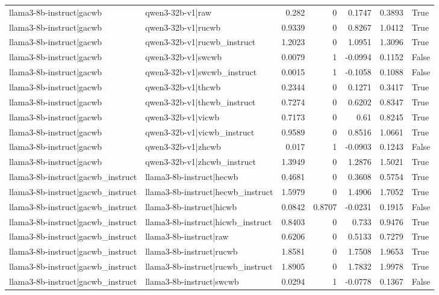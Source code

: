 \begin{table}
\begin{tabular}{l l r r r r l}
llama3-8b-instruct|gacwb & qwen3-32b-v1|raw & 0.282 & 0 & 0.1747 & 0.3893 & True \\
llama3-8b-instruct|gacwb & qwen3-32b-v1|rucwb & 0.9339 & 0 & 0.8267 & 1.0412 & True \\
llama3-8b-instruct|gacwb & qwen3-32b-v1|rucwb_instruct & 1.2023 & 0 & 1.0951 & 1.3096 & True \\
llama3-8b-instruct|gacwb & qwen3-32b-v1|swcwb & 0.0079 & 1 & -0.0994 & 0.1152 & False \\
llama3-8b-instruct|gacwb & qwen3-32b-v1|swcwb_instruct & 0.0015 & 1 & -0.1058 & 0.1088 & False \\
llama3-8b-instruct|gacwb & qwen3-32b-v1|thcwb & 0.2344 & 0 & 0.1271 & 0.3417 & True \\
llama3-8b-instruct|gacwb & qwen3-32b-v1|thcwb_instruct & 0.7274 & 0 & 0.6202 & 0.8347 & True \\
llama3-8b-instruct|gacwb & qwen3-32b-v1|vicwb & 0.7173 & 0 & 0.61 & 0.8245 & True \\
llama3-8b-instruct|gacwb & qwen3-32b-v1|vicwb_instruct & 0.9589 & 0 & 0.8516 & 1.0661 & True \\
llama3-8b-instruct|gacwb & qwen3-32b-v1|zhcwb & 0.017 & 1 & -0.0903 & 0.1243 & False \\
llama3-8b-instruct|gacwb & qwen3-32b-v1|zhcwb_instruct & 1.3949 & 0 & 1.2876 & 1.5021 & True \\
llama3-8b-instruct|gacwb_instruct & llama3-8b-instruct|hecwb & 0.4681 & 0 & 0.3608 & 0.5754 & True \\
llama3-8b-instruct|gacwb_instruct & llama3-8b-instruct|hecwb_instruct & 1.5979 & 0 & 1.4906 & 1.7052 & True \\
llama3-8b-instruct|gacwb_instruct & llama3-8b-instruct|hicwb & 0.0842 & 0.8707 & -0.0231 & 0.1915 & False \\
llama3-8b-instruct|gacwb_instruct & llama3-8b-instruct|hicwb_instruct & 0.8403 & 0 & 0.733 & 0.9476 & True \\
llama3-8b-instruct|gacwb_instruct & llama3-8b-instruct|raw & 0.6206 & 0 & 0.5133 & 0.7279 & True \\
llama3-8b-instruct|gacwb_instruct & llama3-8b-instruct|rucwb & 1.8581 & 0 & 1.7508 & 1.9653 & True \\
llama3-8b-instruct|gacwb_instruct & llama3-8b-instruct|rucwb_instruct & 1.8905 & 0 & 1.7832 & 1.9978 & True \\
llama3-8b-instruct|gacwb_instruct & llama3-8b-instruct|swcwb & 0.0294 & 1 & -0.0778 & 0.1367 & False \\

\end{tabular}
\end{table}
